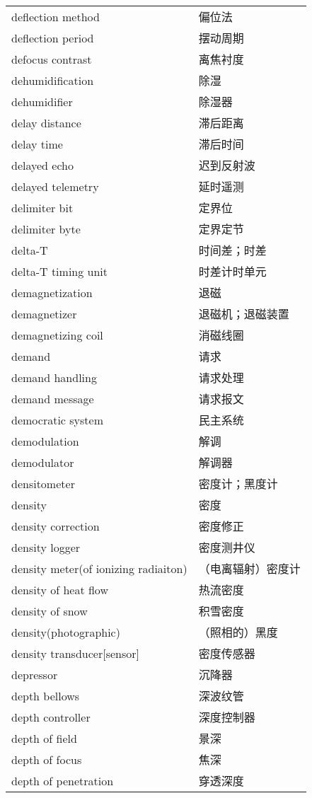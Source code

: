 \documentclass[
]{article}
\begin{document}
\begin{longtable}[]{@{}ll@{}}
deflection method & 偏位法 \\
deflection period & 摆动周期 \\
defocus contrast & 离焦衬度 \\
dehumidification & 除湿 \\
dehumidifier & 除湿器 \\
delay distance & 滞后距离 \\
delay time & 滞后时间 \\
delayed echo & 迟到反射波 \\
delayed telemetry & 延时遥测 \\
delimiter bit & 定界位 \\
delimiter byte & 定界定节 \\
delta-T & 时间差；时差 \\
delta-T timing unit & 时差计时单元 \\
demagnetization & 退磁 \\
demagnetizer & 退磁机；退磁装置 \\
demagnetizing coil & 消磁线圈 \\
demand & 请求 \\
demand handling & 请求处理 \\
demand message & 请求报文 \\
democratic system & 民主系统 \\
demodulation & 解调 \\
demodulator & 解调器 \\
densitometer & 密度计；黑度计 \\
density & 密度 \\
density correction & 密度修正 \\
density logger & 密度测井仪 \\
density meter(of ionizing radiaiton) & （电离辐射）密度计 \\
density of heat flow & 热流密度 \\
density of snow & 积雪密度 \\
density(photographic) & （照相的）黑度 \\
density transducer{[}sensor{]} & 密度传感器 \\
depressor & 沉降器 \\
depth bellows & 深波纹管 \\
depth controller & 深度控制器 \\
depth of field & 景深 \\
depth of focus & 焦深 \\
depth of penetration & 穿透深度 \\

\end{longtable}
\end{document}
